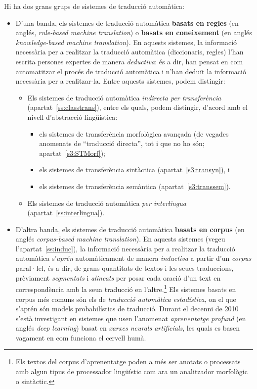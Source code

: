 Hi ha dos grans grups de sistemes de traducció automàtica:
\begin{itemize}
\item D'una banda, els sistemes de traducció automàtica \textbf{basats
    en regles} (en anglés, \emph{rule-based machine translation}) o
  \textbf{basats en coneixement} (en anglés \emph{knowledge-based
    machine translation}). En aquests sistemes, la informació
  necessària per a realitzar la traducció automàtica (diccionaris,
  regles) l'han escrita persones expertes de manera \emph{deductiva}:
  és a dir, han pensat en com automatitzar el procés de traducció
  automàtica i n'han deduït la informació necessària per a
  realitzar-la. Entre aquests sistemes, podem distingir:
  \begin{itemize}
  \item Els sistemes de traducció automàtica \emph{indirecta per
      transferència} (apartat~\ref{ss:classtrans}), entre els quals,
    podem distingir, d'acord amb el nivell d'abstracció lingüística:
    \begin{itemize}
    \item els sistemes de transferència morfològica avançada (de
      vegades anomenats de ``traducció directa'', tot i que no ho són;
      apartat~\ref{s3:STMorf});
    \item els sistemes de transferència sintàctica
      (apartat~\ref{s3:transyn}), i
    \item els sistemes de transferència semàntica
      (apartat~\ref{s3:transsem}).
    \end{itemize}
  \item Els sistemes de traducció automàtica \emph{per interlingua}
    (apartat~\ref{ss:interlingua}).
  \end{itemize}
\item D'altra banda, els sistemes de traducció automàtica
  \textbf{basats en corpus} (en anglés \emph{corpus-based machine
    translation}). En aquests sistemes (vegeu
  l'apartat~\ref{ss:induc}), la informació necessària per a realitzar
  la traducció automàtica s'\emph{aprén} automàticament de manera
  \emph{inductiva} a partir d'un \emph{corpus} paral·lel, és a dir, de
  grans quantitats de textos i les seues traduccions, prèviament
  \emph{segmentats} i \emph{alineats} per posar cada oració d'un text
  en correspondència amb la seua traducció en l'altre.\footnote{Els
    textos del corpus d'aprenentatge poden a més ser anotats o
    processats amb algun tipus de processador lingüístic com ara un
    analitzador morfològic o sintàctic.} Els sistemes basats en corpus
  més comuns són els de \emph{traducció automàtica estadística}, on el
  que s'aprén són models probabilístics de traducció. Durant el
  decenni de 2010 s'està investigant en sistemes que usen l'anomenat
  \emph{aprenentatge profund} (en anglés \emph{deep learning}) basat
  en \emph{xarxes neurals artificials}, les quals es basen vagament en
  com funciona el cervell humà. 
\end{itemize}


